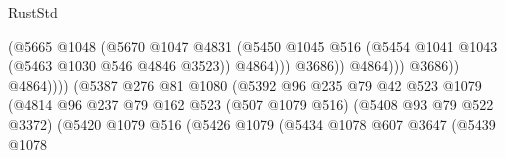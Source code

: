 \begin{lexlean}{RustStd}
\begin{coremodule}
                                                          (@5665
                                                            @1048
                                                            (@5670
                                                              @1047
                                                              @4831
                                                              (@5450
                                                                @1045
                                                                @516
                                                                (@5454
                                                                  @1041
                                                                  @1043
                                                                  (@5463 @1030 @546 @4846 @3523))
                                                                @4864)))
                                                          @3686))
                                                      @4864)))
                                                @3686))
                                            @4864))))
                                    (@5387
                                      @276
                                      @81
                                      @1080
                                      (@5392
                                        @96
                                        @235
                                        @79
                                        @42
                                        @523
                                        @1079
                                        (@4814
                                          @96
                                          @237
                                          @79
                                          @162
                                          @523
                                          (@507 @1079 @516)
                                          (@5408 @93 @79 @522 @3372)
                                          (@5420
                                            @1079
                                            @516
                                            (@5426
                                              @1079
                                              (@5434
                                                @1078
                                                @607
                                                @3647
                                                (@5439
                                                  @1078

\end{coremodule}
\end{lexlean}
